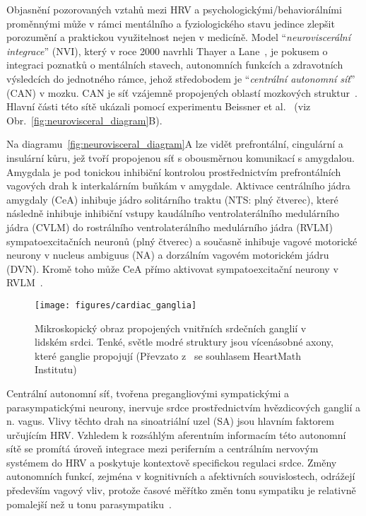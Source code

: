 
Objasnění pozorovaných vztahů mezi \gls{HRV} a psychologickými/behaviorálními
proměnnými může v rámci mentálního a fyziologického stavu jedince zlepšit
porozumění a praktickou využitelnost nejen v medicíně. Model
\enquote{\emph{neuroviscerální integrace}} (\gls{NVI}), který v roce 2000
navrhli Thayer a Lane~\cite{Thayer_Lane_2000}, je pokusem o integraci poznatků o
mentálních stavech, autonomních funkcích a zdravotních výsledcích do jednotného
rámce, jehož středobodem je \enquote{\emph{centrální autonomní síť}} (\gls{CAN})
v mozku. \gls{CAN} je síť vzájemně propojených oblastí mozkových
struktur~\cite{Thayer_Lane_2009}. Hlavní části této sítě ukázali pomocí
experimentu Beissner et al.~\cite{Beissner2013} (viz
Obr.~\ref{fig:neurovisceral_diagram}B).

Na diagramu~\ref{fig:neurovisceral_diagram}A lze vidět prefrontální, cingulární a
insulární kůru, jež tvoří propojenou síť s obousměrnou komunikací s amygdalou.
Amygdala je pod tonickou inhibiční kontrolou prostřednictvím prefrontálních
vagových drah k interkalárním buňkám v amygdale. Aktivace centrálního jádra
amygdaly (\gls{CeA}) inhibuje jádro solitárního traktu (\gls{NTS}: plný
čtverec), které následně inhibuje inhibiční vstupy kaudálního ventrolaterálního
medulárního jádra (\gls{CVLM}) do rostrálního ventrolaterálního medulárního
jádra (\gls{RVLM}) sympatoexcitačních neuronů (plný čtverec) a současně inhibuje
vagové motorické neurony v nucleus ambiguus (\gls{NA}) a dorzálním vagovém
motorickém jádru (\gls{DVN}). Kromě toho může CeA přímo aktivovat
sympatoexcitační neurony v RVLM~\cite{gianaros2008}.

\begin{figure}[!htb]
    \begin{center}
        \texttt{[image: figures/cardiac\_ganglia]}
        \caption{Mikroskopický obraz propojených vnitřních srdečních ganglií v
            lidském srdci. Tenké, světle modré struktury jsou vícenásobné axony,
            které ganglie propojují (Převzato z~\cite{Shaffer2014} se
            souhlasem HeartMath Institutu)}
        \label{fig:cardiac_ganglia}
    \end{center}
\end{figure}

Centrální autonomní síť, tvořena pregangliovými sympatickými a parasympatickými
neurony, inervuje srdce prostřednictvím hvězdicových ganglií a n. vagus. Vlivy
těchto drah na sinoatriální uzel (\gls{SA}) jsou hlavním faktorem určujícím
\gls{HRV}. Vzhledem k rozsáhlým aferentním informacím této autonomní sítě se
promítá úroveň integrace mezi periferním a centrálním nervovým systémem do
\gls{HRV} a poskytuje kontextově specifickou regulaci srdce. Změny autonomních
funkcí, zejména v kognitivních a afektivních souvislostech, odrážejí především
vagový vliv, protože časové měřítko změn tonu sympatiku je relativně pomalejší
než u tonu parasympatiku~\cite{Thayer_Lane_2009,Thayer2009}.

